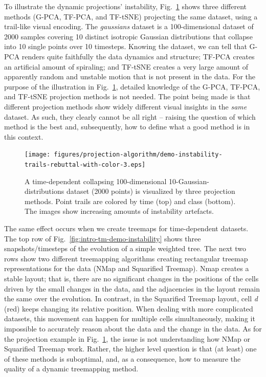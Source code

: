 To illustrate the dynamic projections' instability, Fig.~\ref{fig:intro-pj-demo-instability} shows three different methods (G-PCA, TF-PCA, and TF-tSNE) projecting the same dataset, using a trail-like visual encoding. The \emph{gaussians} dataset is a 100-dimensional dataset of 2000 samples covering 10 distinct isotropic Gaussian distributions that collapse into 10 single points over 10 timesteps. Knowing the dataset, we can tell that G-PCA renders quite faithfully the data dynamics and structure; TF-PCA creates an artificial amount of spiraling; and TF-tSNE creates a very large amount of apparently random and unstable motion that is not present in the data.  For the purpose of the illustration in Fig.~\ref{fig:intro-pj-demo-instability}, detailed knowledge of the G-PCA, TF-PCA, and TF-tSNE projection methods is not needed. The point being made is that different projection methods show widely different visual insights in the \emph{same} dataset. As such, they clearly cannot be all right -- raising the question of which method is the best and, subsequently, how to define what a good method is in this context.

\begin{figure}[h]
    \centering
    \texttt{[image: figures/projection-algorithm/demo-instability-trails-rebuttal-with-color-3.eps]}
    \caption{A time-dependent collapsing 100-dimensional 10-Gaussian-distributions dataset (2000 points) is visualized by three projection methods. Point trails are colored by time (top) and class (bottom). The images show increasing amounts of instability artefacts.}
    \label{fig:intro-pj-demo-instability}
\end{figure}

The same effect occurs when we create treemaps for time-dependent datasets. The top row of Fig.~\ref{fig:intro-tm-demo-instability} shows three snapshots/timesteps of the evolution of a simple weighted tree. The next two rows show two different treemapping algorithms creating rectangular treemap representations for the data (NMap and Squarified Treemap). Nmap creates a stable layout; that is, there are no significant changes in the positions of the cells driven by the small changes in the data, and the adjacencies in the layout remain the same over the evolution. In contrast, in the Squarified Treemap layout, cell \emph{d} (red) keeps changing its relative position. When dealing with more complicated datasets, this movement can happen for multiple cells simultaneously, making it impossible to accurately reason about the data and the change in the data. As for the projection example in Fig.~\ref{fig:intro-pj-demo-instability}, the issue is not understanding how NMap or Squarified Treemap work. Rather, the higher level question is that (at least) one of these methods is suboptimal, and, as a consequence, how to measure the quality of a dynamic treemapping method.

